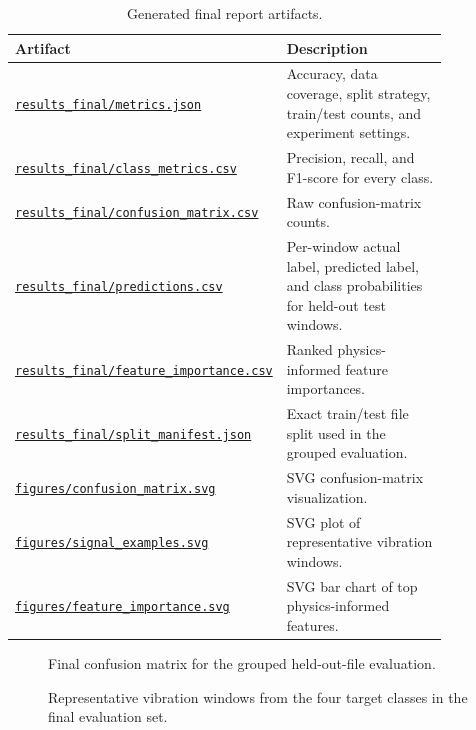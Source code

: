 \documentclass[11pt,a4paper]{article}
\begin{document}
\begin{table}[H]
\centering
\caption{Generated final report artifacts.}
\label{tab:artifacts}
\begin{tabular}{p{0.39\linewidth}p{0.47\linewidth}}
\toprule
\textbf{Artifact} & \textbf{Description} \\
\midrule
\href{run:results_final/metrics.json}{\texttt{results\_final/metrics.json}} & Accuracy, data coverage, split strategy, train/test counts, and experiment settings. \\
\href{run:results_final/class_metrics.csv}{\texttt{results\_final/class\_metrics.csv}} & Precision, recall, and F1-score for every class. \\
\href{run:results_final/confusion_matrix.csv}{\texttt{results\_final/confusion\_matrix.csv}} & Raw confusion-matrix counts. \\
\href{run:results_final/predictions.csv}{\texttt{results\_final/predictions.csv}} & Per-window actual label, predicted label, and class probabilities for held-out test windows. \\
\href{run:results_final/feature_importance.csv}{\texttt{results\_final/feature\_importance.csv}} & Ranked physics-informed feature importances. \\
\href{run:results_final/split_manifest.json}{\texttt{results\_final/split\_manifest.json}} & Exact train/test file split used in the grouped evaluation. \\
\href{run:results_final/figures/confusion_matrix.svg}{\texttt{figures/confusion\_matrix.svg}} & SVG confusion-matrix visualization. \\
\href{run:results_final/figures/signal_examples.svg}{\texttt{figures/signal\_examples.svg}} & SVG plot of representative vibration windows. \\
\href{run:results_final/figures/feature_importance.svg}{\texttt{figures/feature\_importance.svg}} & SVG bar chart of top physics-informed features. \\
\bottomrule
\end{tabular}
\end{table}

\begin{figure}[H]
\centering

\caption{Final confusion matrix for the grouped held-out-file evaluation.}
\label{fig:confusion}
\end{figure}

\begin{figure}[H]
\centering

\caption{Representative vibration windows from the four target classes in the final evaluation set.}
\label{fig:signals}
\end{figure}
\end{document}
